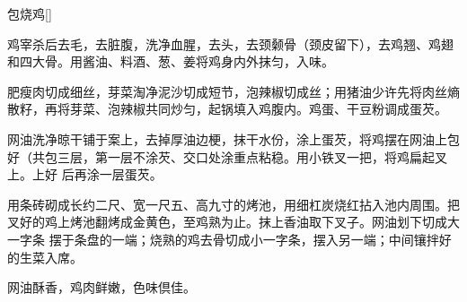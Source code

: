 \begin{recipe}{包烧鸡}[\footnotemark]

\ingredients



\preparation

\step 鸡宰杀后去毛，去脏腹，洗净血腥，去头，去颈颡骨（颈皮留下），去鸡翘、鸡翅
和四大骨。用酱油、料酒、葱、姜将鸡身内外抹匀，入味。

\step 肥瘦肉切成细丝，芽菜淘净泥沙切成短节，泡辣椒切成丝；用猪油少许先将肉丝熵
散籽，再将芽菜、泡辣椒共同炒匀，起锅填入鸡腹内。鸡蛋、干豆粉调成蛋芡。

\step 网油洗净晾干铺于案上，去掉厚油边梗，抹干水份，涂上蛋芡，将鸡摆在网油上包
好（共包三层，第一层不涂芡、交口处涂重点粘稳。用小铁叉一把，将鸡扁起叉上。上好
后再涂一层蛋芡。

\step 用条砖砌成长约二尺、宽一尺五、高九寸的烤池，用细杠炭烧红拈入池内周围。把
叉好的鸡上烤池翻烤成金黄色，至鸡熟为止。抹上香油取下叉子。网油划下切成大一字条
摆于条盘的一端；烧熟的鸡去骨切成小一字条，摆入另一端；中间镶拌好的生菜入席。

\features

网油酥香，鸡肉鲜嫩，色味倶佳。


\end{recipe}

